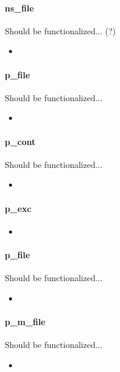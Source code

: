 \documentclass[12pt]{article}
\begin{document}
\paragraph{ns\_file}
Should be functionalized... (?)
	\begin{itemize}
		\item 
	\end{itemize}

\paragraph{p\_file}
Should be functionalized...
	\begin{itemize}
		\item 
	\end{itemize}

\paragraph{p\_cont}
Should be functionalized...
	\begin{itemize}
		\item
	\end{itemize}

\paragraph{p\_exc}
	\begin{itemize}
		\item 
	\end{itemize}

\paragraph{p\_file}
Should be functionalized...
	\begin{itemize}
		\item 
	\end{itemize}

\paragraph{p\_m\_file}
Should be functionalized...
	\begin{itemize}
		\item 
	\end{itemize}
\end{document}
